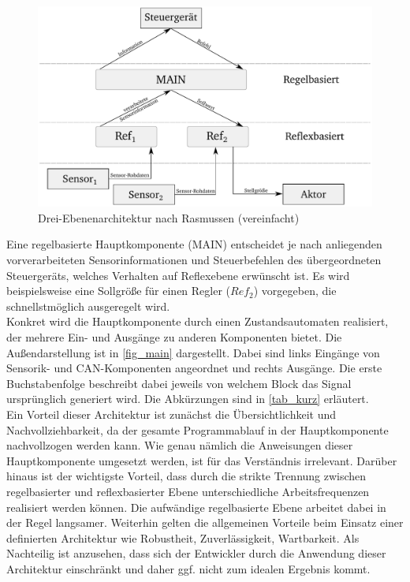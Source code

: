 \begin{figure}%
\centering
\includegraphics[width=0.8\columnwidth]{./Bilder/fig_arch}%
\caption{Drei-Ebenenarchitektur nach Rasmussen (vereinfacht)}%
\label{fig_arch}%
\end{figure}
Eine regelbasierte Hauptkomponente (MAIN) entscheidet je nach anliegenden vorverarbeiteten Sensorinformationen und Steuerbefehlen des übergeordneten Steuergeräts, welches Verhalten auf Reflexebene erwünscht ist. Es wird beispielsweise eine Sollgröße für einen Regler ($Ref_{2}$) vorgegeben, die schnellstmöglich ausgeregelt wird. \\
Konkret wird die Hauptkomponente durch einen Zustandsautomaten realisiert, der mehrere Ein- und Ausgänge zu anderen Komponenten bietet. Die Außendarstellung ist in \autoref{fig_main} dargestellt. Dabei sind links Eingänge von Sensorik- und CAN-Komponenten angeordnet und rechts Ausgänge. Die erste Buchstabenfolge beschreibt dabei jeweils von welchem Block das Signal ursprünglich generiert wird. Die Abkürzungen sind in \autoref{tab_kurz} erläutert. \\
Ein Vorteil dieser Architektur ist zunächst die Übersichtlichkeit und Nachvollziehbarkeit, da der gesamte Programmablauf in der Hauptkomponente nachvollzogen werden kann. Wie genau nämlich die Anweisungen dieser Hauptkomponente umgesetzt werden, ist für das Verständnis irrelevant. Darüber hinaus ist der wichtigste Vorteil, dass durch die strikte Trennung zwischen regelbasierter und reflexbasierter Ebene unterschiedliche Arbeitsfrequenzen realisiert werden können. Die aufwändige regelbasierte Ebene arbeitet dabei in der Regel langsamer. Weiterhin gelten die allgemeinen Vorteile beim Einsatz einer definierten Architektur wie Robustheit, Zuverlässigkeit, Wartbarkeit. Als Nachteilig ist anzusehen, dass sich der Entwickler durch die Anwendung dieser Architektur einschränkt und daher ggf. nicht zum idealen Ergebnis kommt. \cite{Rasmussen} \\
